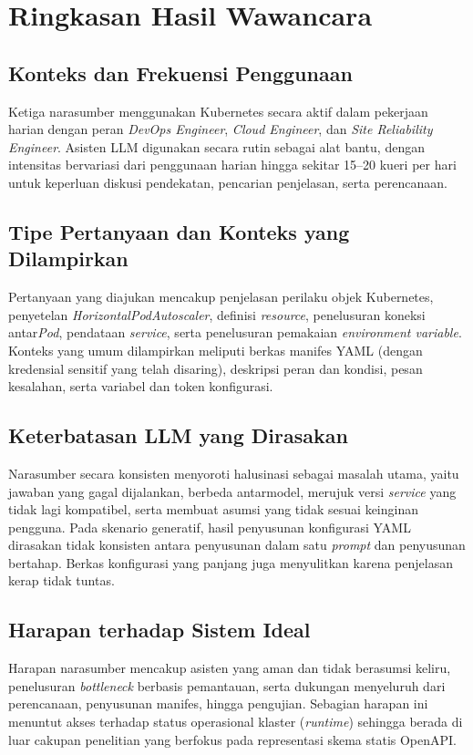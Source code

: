 \section{Ringkasan Hasil Wawancara}

\subsection{Konteks dan Frekuensi Penggunaan}
Ketiga narasumber menggunakan Kubernetes secara aktif dalam pekerjaan harian dengan peran \textit{DevOps Engineer}, \textit{Cloud Engineer}, dan \textit{Site Reliability Engineer}. Asisten LLM digunakan secara rutin sebagai alat bantu, dengan intensitas bervariasi dari penggunaan harian hingga sekitar 15--20 kueri per hari untuk keperluan diskusi pendekatan, pencarian penjelasan, serta perencanaan.

\subsection{Tipe Pertanyaan dan Konteks yang Dilampirkan}
Pertanyaan yang diajukan mencakup penjelasan perilaku objek Kubernetes, penyetelan \textit{HorizontalPodAutoscaler}, definisi \textit{resource}, penelusuran koneksi antar\textit{Pod}, pendataan \textit{service}, serta penelusuran pemakaian \textit{environment variable}. Konteks yang umum dilampirkan meliputi berkas manifes YAML (dengan kredensial sensitif yang telah disaring), deskripsi peran dan kondisi, pesan kesalahan, serta variabel dan token konfigurasi.

\subsection{Keterbatasan LLM yang Dirasakan}
Narasumber secara konsisten menyoroti halusinasi sebagai masalah utama, yaitu jawaban yang gagal dijalankan, berbeda antarmodel, merujuk versi \textit{service} yang tidak lagi kompatibel, serta membuat asumsi yang tidak sesuai keinginan pengguna. Pada skenario generatif, hasil penyusunan konfigurasi YAML dirasakan tidak konsisten antara penyusunan dalam satu \textit{prompt} dan penyusunan bertahap. Berkas konfigurasi yang panjang juga menyulitkan karena penjelasan kerap tidak tuntas.

\subsection{Harapan terhadap Sistem Ideal}
Harapan narasumber mencakup asisten yang aman dan tidak berasumsi keliru, penelusuran \textit{bottleneck} berbasis pemantauan, serta dukungan menyeluruh dari perencanaan, penyusunan manifes, hingga pengujian. Sebagian harapan ini menuntut akses terhadap status operasional klaster (\textit{runtime}) sehingga berada di luar cakupan penelitian yang berfokus pada representasi skema statis OpenAPI.

